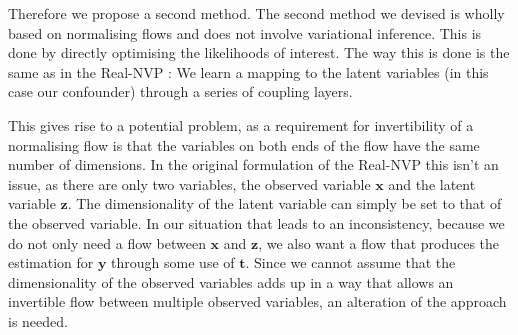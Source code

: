 \documentclass{report}
\newcommand{\bt}{\mathbf{t}}
\newcommand{\bx}{\mathbf{x}}
\newcommand{\by}{\mathbf{y}}
\newcommand{\bz}{\mathbf{z}}
\begin{document}
Therefore we propose a second method. The second method we devised is wholly based on normalising flows and does not involve variational inference. This is done by directly optimising the likelihoods of interest. The way this is done is the same as in the Real-NVP \parencite{dinh2016density}: We learn a mapping to the latent variables (in this case our confounder) through a series of coupling layers.

This gives rise to a potential problem, as a requirement for invertibility of a normalising flow is that the variables on both ends of the flow have the same number of dimensions. In the original formulation of the Real-NVP this isn't an issue, as there are only two variables, the observed variable $\bx$ and the latent variable $\bz$. The dimensionality of the latent variable can simply be set to that of the observed variable. In our situation that leads to an inconsistency, because we do not only need a flow between $\bx$ and $\bz$, we also want a flow that produces the estimation for $\by$ through some use of $\bt$. Since we cannot assume that the dimensionality of the observed variables adds up in a way that allows an invertible flow between multiple observed variables, an alteration of the approach is needed.
\end{document}
